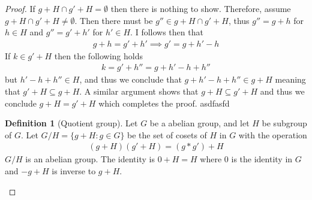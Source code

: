 \documentclass{article}
\theoremstyle{plain}
\theoremstyle{definition}
\newtheorem{definition}[theorem]{Definition}
\begin{document}
\begin{proof}
	If $g+H\cap g'+H=\emptyset$ then there is nothing to show. Therefore, assume
	$g+H\cap g'+H\neq\emptyset$. Then there must be $g''\in g+H\cap g'+H$, thus
	$g''=g+h$ for $h\in H$ and $g''=g'+h'$ for $h'\in H$. I follows then that
	\begin{equation}
	\begin{aligned}
		g+h=g'+h'\implies g'=g+h'-h
	\end{aligned}
	\end{equation}
	If $k\in g'+H$ then the following holds
	\begin{equation}
	\begin{aligned}
		k=g'+h''=g+h'-h+h''
	\end{aligned}
	\end{equation}
	but $h'-h+h''\in H$, and thus we conclude that $g+h'-h+h''\in g+H$ meaning
	that $g'+H\subseteq g+H$. A similar argument shows that $g+H\subseteq g'+H$
	and thus we conclude $g+H=g'+H$ which completes the proof. asdfasfd
\begin{definition}[Quotient group]\label{quotient group}
	Let $G$ be a abelian group, and let $H$ be subgroup of $G$. Let
	$G/H = \{g+H:g\in G\}$ be the set of cosets of $H$ in $G$ with
	the operation
	\begin{equation}
	\begin{aligned}
		(g+H)(g'+H)=(g*g')+H
	\end{aligned}
	\end{equation}
	$G/H$ is an abelian group. The identity is $0+H=H$ where $0$ is the identity
	in $G$ and $-g+H$ is inverse to $g+H$.
\end{definition}
\end{proof}
\end{document}
